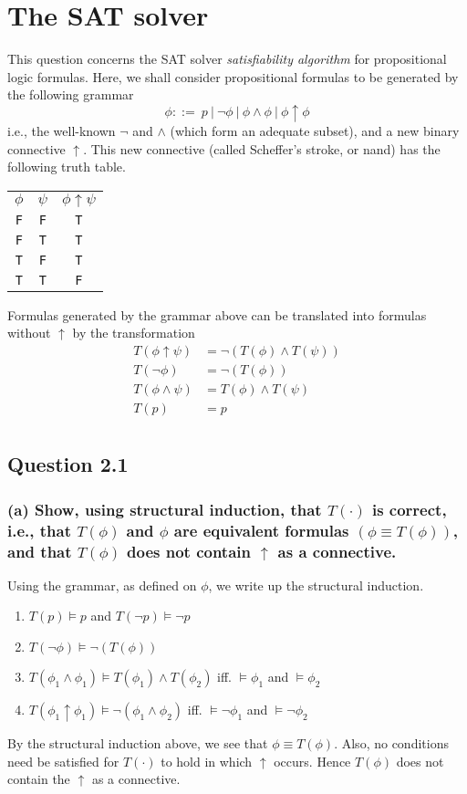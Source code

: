 \section{The SAT solver}
This question concerns the SAT solver {\it satisfiability algorithm} for
propositional logic formulas. Here, we shall consider propositional formulas
to be generated by the following grammar
\[ \phi::={\ }p{\ }|{\ }\neg\phi{\ }|{\ }\phi \land \phi{\ }|{\ }\phi \uparrow \phi \]
i.e., the well-known $\neg$ and $\land$ (which form an adequate subset), and a
new binary connective $\uparrow$. This new connective (called Scheffer’s
stroke, or nand) has the following truth table.
\begin{center}
\begin{tabular}{c|c||c}
	$\phi$ & $\psi$ & $\phi \uparrow \psi$ \\
	{\tt F} & {\tt F} & {\tt T} \\
	{\tt F} & {\tt T} & {\tt T} \\
	{\tt T} & {\tt F} & {\tt T} \\
	{\tt T} & {\tt T} & {\tt F}
\end{tabular}
\end{center}
Formulas generated by the grammar above can be translated into formulas
without $\uparrow$ by the transformation
\begin{align*}
	T(\phi \uparrow \psi) &= \neg(T(\phi) \land T(\psi)) \\
	T(\neg\phi) &= \neg(T(\phi)) \\
	T(\phi \land \psi) &= T(\phi) \land T(\psi) \\
	T(p) &= p \\
\end{align*}

\subsection*{Question 2.1}
\subsubsection*{(a) \mdseries Show, using structural induction, that
$T(\cdot)$ is correct, i.e., that $T(\phi)$ and $\phi$ are equivalent
formulas $(\phi \equiv T(\phi))$, and that $T(\phi)$ does not contain
$\uparrow$ as a connective.}
Using the grammar, as defined on $\phi$, we write up the structural induction.
\begin{enumerate}
	\item $T(p) \models p$ and $T(\neg p) \models \neg p$
	\item $T(\neg \phi) \models \neg (T(\phi))$
	\item $T(\phi_1 \land \phi_1) \models T(\phi_1) \land T(\phi_2)$
	iff. $\models \phi_1$ and $\models \phi_2$
	\item $T(\phi_1 \uparrow \phi_1) \models \neg(\phi_1 \land \phi_2)$
	iff. $\models \neg \phi_1$ and $\models \neg \phi_2$
\end{enumerate}
By the structural induction above, we see that $\phi \equiv T(\phi)$. Also,
no conditions need be satisfied for $T(\cdot)$ to hold in which $\uparrow$
occurs. Hence $T(\phi)$ does not contain the $\uparrow$ as a connective.

